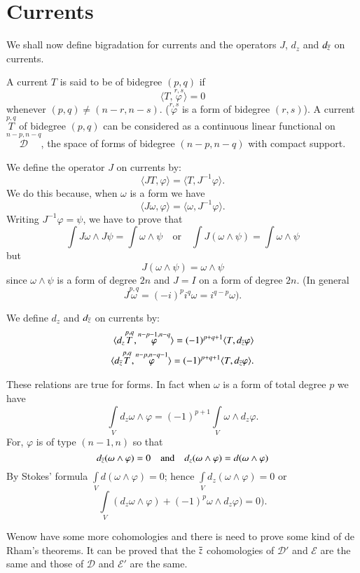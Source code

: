 \section*{Currents}

We shall now define bigradation for currents and the operators $J$,
$d_{z}$ and $d_{\overline{z}}$ on currents.

A current $T$ is said to be of bidegree $(p,q)$ if
$$
\langle T,\overset{r,s}{\varphi}\rangle =0
$$
whenever $(p,q)\neq (n-r,n-s)$. ($\overset{r,s}{\varphi}$ is a form of
bidegree $(r,s)$). A current $\overset{p,q}{T}$ of bidegree $(p,q)$
can be considered as a continuous linear functional on
$\overset{n-p,n-q}{\mathscr{D}}$, the space of forms of bidegree
$(n-p,n-q)$ with compact support.

We define the operator $J$ on currents by:
$$
\langle JT,\varphi\rangle=\langle T,J^{-1}\varphi\rangle.
$$
We do this because, when $\omega$ is a form we have
$$
\langle J\omega,\varphi\rangle=\langle\omega,J^{-1}\varphi\rangle.
$$
Writing $J^{-1}\varphi=\psi$, we have to prove that 
$$
\int J\omega\wedge J\psi=\int\omega\wedge \psi\quad\text{or}\quad \int
J(\omega\wedge\psi)=\int\omega\wedge\psi 
$$\pageoriginale
but
$$
J(\omega\wedge\psi)=\omega\wedge\psi
$$
since $\omega\wedge\psi$ is a form of degree $2n$ and $J=I$ on a form
of degree $2n$. (In general
$$
J\overset{p,q}{\omega}=(-i)^{p}i^{q}\omega=i^{q-p}\omega).
$$

We define $d_{z}$ and $d_{\overline{z}}$ on currents by:
\begin{align*}
\langle
d_{z}\overset{p,q}{T},\overset{n-p-1,n-q}{\varphi}\rangle=(-1)^{p+q+1}\langle
T,d_{\overline{z}}\varphi\rangle\\
\langle d_{\overline{z}}\overset{p,q}{T},\overset{n-p,n-q-1}{\varphi}\rangle
=(-1)^{p+q+1}\langle T,d_{\overline{z}}\varphi\rangle. 
\end{align*}

These relations are true for forms. In fact when $\omega$ is a form 
of total degree $p$ we have
$$
\int\limits_{V}d_{z}\omega\wedge
\varphi=(-1)^{p+1}\int\limits_{V}\omega\wedge d_{z}\varphi.
$$
For, $\varphi$ is of type $(n-1,n)$ so that
$$
d_{\overline{z}}(\omega\wedge\varphi)=0\quad\text{and}\quad
d_{z}(\omega\wedge\varphi)=d(\omega\wedge \varphi)
$$
By Stokes' formula $\int\limits_{V}d(\omega\wedge\varphi)=0$; hence
$\int\limits_{V}d_{z}(\omega\wedge \varphi)=0$ or 
$$
\int\limits_{V}(d_{z}\omega\wedge\varphi)+(-1)^{p}\omega\wedge
d_{z}\varphi)=0).
$$

We\pageoriginale now have some more cohomologies and there is need to
prove some kind of de Rham's theorems. It can be proved that the
$\overline{z}$ cohomologies of $\mathscr{D}'$ and $\mathscr{E}$ are the same
and those of $\mathscr{D}$ and $\mathscr{E}'$ are the same.

